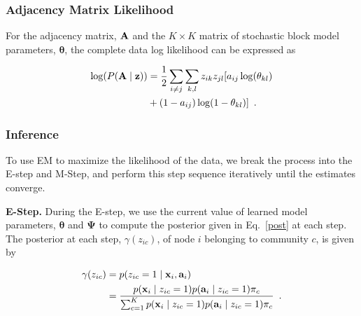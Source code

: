 \subsubsection{Adjacency Matrix Likelihood}
For the adjacency matrix, ${\bf A}$ and the $K \times K$ matrix of stochastic block model parameters, ${\boldsymbol \theta}$, the complete data log likelihood can be expressed as

\begin{equation}
\begin{split}
\log(P({\bf A} \mid {\bf z}))&=\frac{1}{2}\sum_{i\ne j}\sum_{k,l}z_{ik}z_{jl}[a_{ij}\log (\theta_{kl})\\
&+(1-a_{ij})\log(1-\theta_{kl})]\enspace. 
\end{split}
\end{equation}



\subsubsection{Inference}
To use EM to maximize the likelihood of the data, we break the process into the E-step and M-Step, and perform this step sequence iteratively until the estimates converge.

\textbf{E-Step.} During the E-step, we use the current value of learned model parameters, ${\boldsymbol \theta}$ and ${\boldsymbol \Psi}$ to compute the posterior given in Eq.~\eqref{post} at each step. The posterior at each step,  $\gamma(z_{ic})$, of node $i$ belonging to community $c$, is given by

\begin{equation}
\begin{split}
\gamma({z_{ic}})& =p(z_{ic}=1\mid {\bf x}_{i}, {\bf a}_{i}) \\
&=\frac{p({\bf x}_{i} \mid z_{ic}=1)p({\bf a}_{i}\mid z_{ic}=1)\pi_{c}}{\sum_{c=1}^{K}p({\bf x}_{i} \mid z_{ic}=1)p({\bf a}_{i}\mid z_{ic}=1)\pi_{c}}\enspace.
\end{split}
\end{equation}

